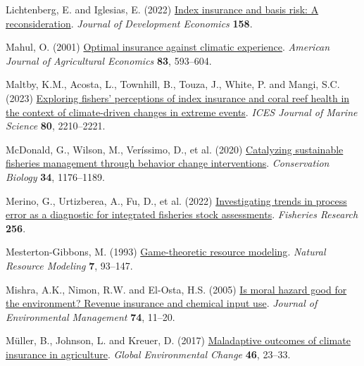 \documentclass[
  letterpaper,
  DIV=11,
  numbers=noendperiod]{scrartcl}
\newlength{\cslhangindent}
\newlength{\cslentryspacingunit} %
\newenvironment{CSLReferences}[2] %
 {%
  \setlength{\parindent}{0pt}
  \ifodd #1
  \let\oldpar\par
  \def\par{\hangindent=\cslhangindent\oldpar}
  \fi
  \setlength{\parskip}{#2\cslentryspacingunit}
 }%
 {}
\theoremstyle{plain}
\theoremstyle{plain}
\theoremstyle{remark}
\begin{document}
\begin{CSLReferences}{1}{0}
\leavevmode{}%
Lichtenberg, E. and Iglesias, E. (2022)
\href{https://doi.org/10.1016/j.jdeveco.2022.102883}{Index insurance and
basis risk: A reconsideration}. \emph{Journal of Development Economics}
\textbf{158}.

\leavevmode{}%
Mahul, O. (2001) \href{https://doi.org/10.1111/0002-9092.00180}{Optimal
insurance against climatic experience}. \emph{American Journal of
Agricultural Economics} \textbf{83}, 593--604.

\leavevmode{}%
Maltby, K.M., Acosta, L., Townhill, B., Touza, J., White, P. and Mangi,
S.C. (2023) \href{https://doi.org/10.1093/icesjms/fsac003}{Exploring
fishers' perceptions of index insurance and coral reef health in the
context of climate-driven changes in extreme events}. \emph{ICES Journal
of Marine Science} \textbf{80}, 2210--2221.

\leavevmode{}%
McDonald, G., Wilson, M., Veríssimo, D., et al. (2020)
\href{https://doi.org/10.1111/cobi.13475}{Catalyzing sustainable
fisheries management through behavior change interventions}.
\emph{Conservation Biology} \textbf{34}, 1176--1189.

\leavevmode{}%
Merino, G., Urtizberea, A., Fu, D., et al. (2022)
\href{https://doi.org/10.1016/j.fishres.2022.106478}{Investigating
trends in process error as a diagnostic for integrated fisheries stock
assessments}. \emph{Fisheries Research} \textbf{256}.

\leavevmode{}%
Mesterton-Gibbons, M. (1993)
\href{https://doi.org/10.1111/j.1939-7445.1993.tb00143.x}{Game-theoretic
resource modeling}. \emph{Natural Resource Modeling} \textbf{7},
93--147.

\leavevmode{}%
Mishra, A.K., Nimon, R.W. and El-Osta, H.S. (2005)
\href{https://doi.org/10.1016/j.jenvman.2004.08.003}{Is moral hazard
good for the environment? Revenue insurance and chemical input use}.
\emph{Journal of Environmental Management} \textbf{74}, 11--20.

\leavevmode{}%
Müller, B., Johnson, L. and Kreuer, D. (2017)
\href{https://doi.org/10.1016/j.gloenvcha.2017.06.010}{Maladaptive
outcomes of climate insurance in agriculture}. \emph{Global
Environmental Change} \textbf{46}, 23--33.


\end{CSLReferences}
\end{document}
